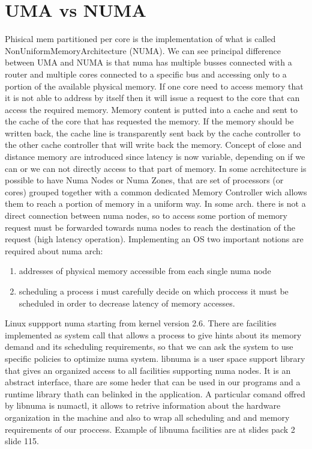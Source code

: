 \documentclass[a4paper,12pt]{article}
\begin{document}
\section{UMA vs NUMA}
Phisical mem partitioned per core is the implementation of what is called NonUniformMemoryArchitecture (NUMA). We can see principal difference between UMA and NUMA is that numa has multiple busses connected with a router and multiple cores connected to a specific bus and accessing only to a portion of the available physical memory. If one core need to access memory that it is not able to address by itself then it will issue a request to the core that can access the required memory. Memory content is putted into a cache and sent to the cache of the core that has requested the memory. If the memory should be written back, the cache line is transparently sent back by the cache controller to the other cache controller that will write back the memory.
Concept of close and distance memory are introduced since latency is now variable, depending on if we can or we can not directly access to that part of memory.
In some acrchitecture is possible to have Numa Nodes or Numa Zones, that are set of processors (or cores) grouped together with a common dedicated Memory Controller wich allows them to reach a portion of memory in a uniform way. In some arch. there is not a direct connection between numa nodes, so to access some portion of memory request must be forwarded towards numa nodes to reach the destination of the request (high latency operation).  
Implementing an OS two important notions are required about numa arch: 
\begin{enumerate} \item addresses of physical memory accessible from each single numa node \item scheduling a process i must carefully decide on which proccess it must be scheduled in order to decrease latency of memory accesses. \end{enumerate} 
Linux suppport numa starting from kernel version 2.6.  There are facilities implemented as system call that allows a process to give hints about its  memory demand  and its scheduling requirements, so that we can ask the system to use specific policies to optimize numa system.
libnuma is a user space support library that gives an organized access to all facilities supporting numa nodes. It is an abstract interface, thare are some heder that can be used in our programs and a runtime library thath can belinked in the application. A particular comand offred by libnuma is numactl, it allows to retrive information about the hardware organization in the machine and also to wrap all scheduling and and memory requirements of our proccess. Example of libnuma facilities are at slides pack 2 slide 115.
\end{document}
